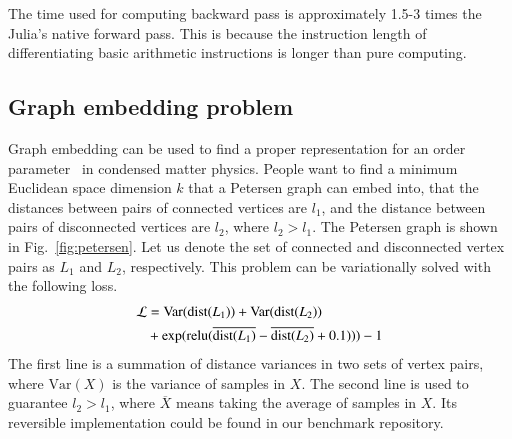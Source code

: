 \documentclass{article}
\newcommand{\<}{\langle}
\renewcommand{\>}{\rangle}
\newcommand{\Var}{{\mathrm{Var}}}
\renewcommand{\cite}[1]{{\citep{#1}}}
\newcommand{\Fig}[1]{Fig.~\ref{#1}}
\theoremstyle{definition}\newtheorem{definition}{\textit{Definition}}
\begin{document}
The time used for computing backward pass is approximately 1.5-3 times the Julia's native forward pass.
This is because the instruction length of differentiating basic arithmetic instructions is longer than pure computing.


\subsection{Graph embedding problem}\label{sec:graphbench}
Graph embedding can be used to find a proper representation for an order parameter~\cite{Takahashi2020} in condensed matter physics. People want to find a minimum Euclidean space dimension $k$ that a Petersen graph can embed into, that the distances between pairs of connected vertices are $l_1$, and the distance between pairs of disconnected vertices are $l_2$, where $l_2 > l_1$.
The Petersen graph is shown in \Fig{fig:petersen}.
Let us denote the set of connected and disconnected vertex pairs as $L_1$ and $L_2$, respectively. This problem can be variationally solved with the following loss.
\begin{align}
    \begin{split}
        \mathcal{L} &= \Var({\rm dist}(L_1)) + \Var({\rm dist}(L_2)) \\
        &+\exp({\rm relu}(\overline{{\rm dist}(L_1)} - \overline{{\rm dist}(L_2)} + 0.1))) - 1
    \end{split}
\end{align}
The first line is a summation of distance variances in two sets of vertex pairs, where $\Var(X)$ is the variance of samples in $X$.
The second line is used to guarantee $l_2 > l_1$, where $\overline{X}$ means taking the average of samples in $X$.
Its reversible implementation could be found in our benchmark repository.
\end{document}
